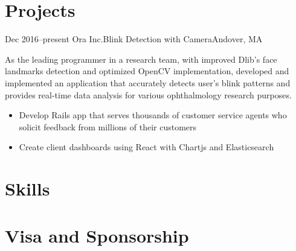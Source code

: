\documentclass[10pt,a4paper,merriweather]{moderncv}        %
\begin{document}
\section{Projects}

\cventry
{Dec 2016--present}
{Ora Inc.}{Blink Detection with Camera}{Andover, MA}{}
{As the leading programmer in a research team, with improved Dlib's face landmarks detection and optimized OpenCV implementation, developed and implemented an application that accurately detects user's blink patterns and provides real-time data analysis for various ophthalmology research purposes.
\begin{itemize}
\item Develop Rails app that serves thousands of customer service agents who solicit feedback from millions of their customers
\item Create client dashboards using React with Chartjs and Elasticsearch
\end{itemize}}
\vspace{.15cm}


\section{Skills}


\section{Visa and Sponsorship}

\end{document}
